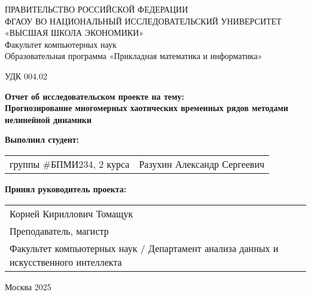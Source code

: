 \documentclass[a4paper, 12pt]{extarticle}
\begin{document}
{
\begin{center}
ПРАВИТЕЛЬСТВО РОССИЙСКОЙ ФЕДЕРАЦИИ\\
ФГАОУ ВО НАЦИОНАЛЬНЫЙ ИССЛЕДОВАТЕЛЬСКИЙ УНИВЕРСИТЕТ\\
«ВЫСШАЯ ШКОЛА ЭКОНОМИКИ»
\\
\bigskip
Факультет компьютерных наук\\
Образовательная программа «Прикладная математика и информатика»
\end{center}
}

\vspace{2em}
УДК 004.02
\vspace{4em}

\begin{center}
    {\bf Отчет об исследовательском проекте на тему:}\\
    {\bf Прогнозирование многомерных хаотических временных рядов методами нелинейной динамики}\\
\end{center}
    
\vspace{2em}
    
{\bf Выполнил студент: \vspace{2mm}}
    
{
\begin{tabular}{l@{\hskip 1.5cm}l}
    группы \#БПМИ234, 2 курса & Разухин Александр Сергеевич \\
\end{tabular}}


\vspace{1em}
{\bf Принял руководитель проекта: \vspace{2mm}}
    
{
\begin{tabular}{l}
    Корней Кириллович Томащук\\
    Преподаватель, магистр\\
    Факультет компьютерных наук / Департамент анализа данных и искусственного интеллекта
\end{tabular}}

\vspace{\fill}

\begin{center}
Москва 2025
\end{center}

\newpage

\begin{abstract}
Работа над данным проектом предполагает исследование методов прогнозирования временных рядов, основанных на использовании информации, полученной из других рядов, которые по некоторым критериям "подходят" для конкретной задачи.
\end{abstract}
\end{document}
